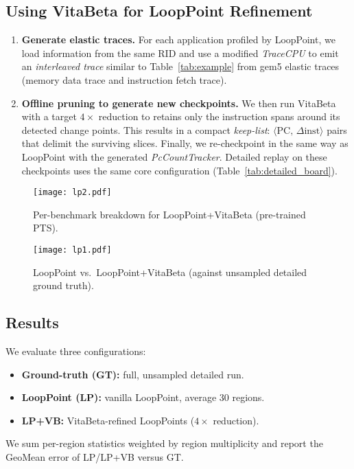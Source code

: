 \subsection{Using VitaBeta  for {LoopPoint Refinement}}
\begin{enumerate}[nosep, leftmargin=*]
\item \textbf{Generate elastic traces.}  
For each application profiled by LoopPoint, we load information from the same RID and use a modified \textit{TraceCPU} to  emit an \textit{interleaved trace} similar to Table~\ref{tab:example} from gem5 elastic traces\cite{elastic_trace_gem5} (memory data trace and instruction fetch trace).
\item \textbf{Offline pruning to generate new checkpoints.}  
    We then run VitaBeta with a target $4\times$ reduction to retains only the
      instruction spans around its detected change points. This results in a compact \emph{keep-list}:
      \(\langle\text{PC},\,\Delta\text{inst}\rangle\) pairs that delimit the surviving slices. Finally, we re-checkpoint in the same way as LoopPoint with the generated \textit{PcCountTracker}. Detailed replay on these checkpoints uses the same core configuration (Table~\ref{tab:detailed_board}).
\end{enumerate} 


\begin{figure*}[!htbp] 
    \centering
    \texttt{[image: lp2.pdf]}
    \caption{Per-benchmark breakdown for LoopPoint+VitaBeta (pre-trained PTS).}
    \label{fig:lp_vb_breakdown} 
\end{figure*}

\begin{figure}[!htbp] 
    \centering
    \texttt{[image: lp1.pdf]}
    \caption{LoopPoint vs.\ LoopPoint+VitaBeta (against unsampled detailed ground truth).}
    \label{fig:lp_vb_comparison} 
\end{figure}

\subsection{Results}
We evaluate three configurations:
\begin{itemize}[nosep, leftmargin=*]
    \item \textbf{Ground-truth (GT): }  full, unsampled detailed run.
    \item \textbf{LoopPoint (LP): }  vanilla LoopPoint, average 30 regions.
    \item \textbf{LP+VB: } VitaBeta-refined LoopPoints ($4\times$ reduction).
\end{itemize}
\smallskip\noindent
We sum per-region statistics weighted by region
multiplicity and report the GeoMean error of
\textsc{LP}/\textsc{LP+VB} versus \textsc{GT}.  


